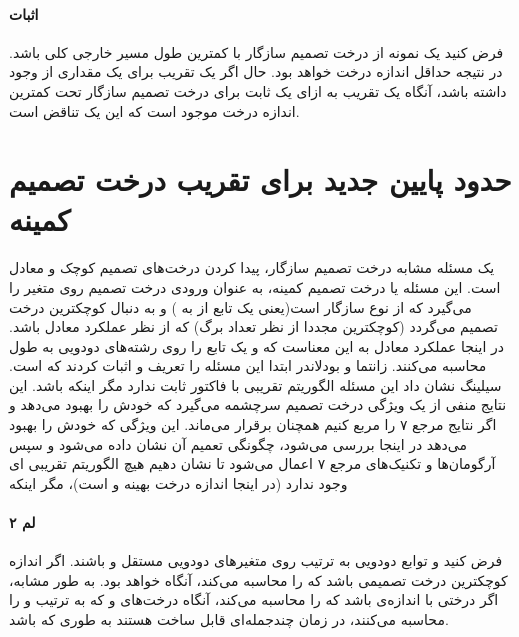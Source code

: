 \documentclass[a4paper]{article}
\begin{document}
	\paragraph{اثبات}
	فرض کنید
	یک نمونه از درخت تصمیم سازگار با کمترین طول مسیر خارجی کلی 
	باشد. در نتیجه حداقل اندازه درخت
	خواهد بود. حال اگر یک تقریب
	برای یک مقداری از 
	وجود داشته باشد، آنگاه یک تقریب 
	به ازای یک ثابت
	برای درخت تصمیم سازگار تحت کمترین اندازه درخت موجود است که این یک تناقض است.
	\section{حدود پایین جدید برای تقریب درخت تصمیم کمینه}
	\paragraph{}
	یک مسئله مشابه درخت تصمیم سازگار، پیدا کردن درخت‌های تصمیم کوچک و معادل است. این مسئله 
	یا درخت تصمیم کمینه، به عنوان ورودی درخت تصمیم
	روی 
	متغیر را می‌گیرد که از نوع سازگار است(یعنی یک تابع از 
	به 
	)
	و به دنبال کوچکترین درخت تصمیم
	می‌گردد (کوچکترین مجددا از نظر تعداد برگ) که از نظر عملکرد معادل
	باشد. در اینجا عملکرد معادل به این معناست که 
	و
	یک تابع را روی رشته‌های دودویی به طول 
	محاسبه می‌کنند. زانتما و بودلاندر ابتدا این مسئله را تعریف و اثبات کردند که
	است. سیلینگ نشان داد این مسئله الگوریتم تقریبی با فاکتور ثابت ندارد مگر اینکه
	باشد. این نتایج منفی از یک ویژگی درخت تصمیم سرچشمه می‌گیرد که خودش را بهبود می‌دهد و اگر نتایج مرجع ۷ را مربع
	کنیم همچنان برقرار می‌ماند. این ویژگی که خودش را بهبود می‌دهد در اینجا بررسی می‌شود، چگونگی تعمیم آن نشان داده
	می‌شود و سپس آرگومان‌ها و تکنیک‌های مرجع ۷ اعمال می‌شود تا نشان دهیم هیچ الگوریتم تقریبی
	ای وجود ندارد (در اینجا 
	اندازه درخت بهینه و
	است)، مگر اینکه 
	\paragraph{لم ۲}
	فرض کنید
	و
	توابع دودویی به ترتیب روی متغیر‌های دودویی مستقل
	و
	باشند. اگر 
	اندازه کوچکترین درخت تصمیمی باشد که
	را محاسبه می‌کند، آنگاه
	خواهد بود. به طور مشابه، اگر 
	درختی با اندازه‌ی
	باشد که 
	را محاسبه می‌کند، آنگاه درخت‌های
	و
	که به ترتیب 
	و
	را محاسبه می‌کنند، در زمان چندجمله‌ای قابل ساخت هستند به طوری که 
	باشد.
\end{document}
